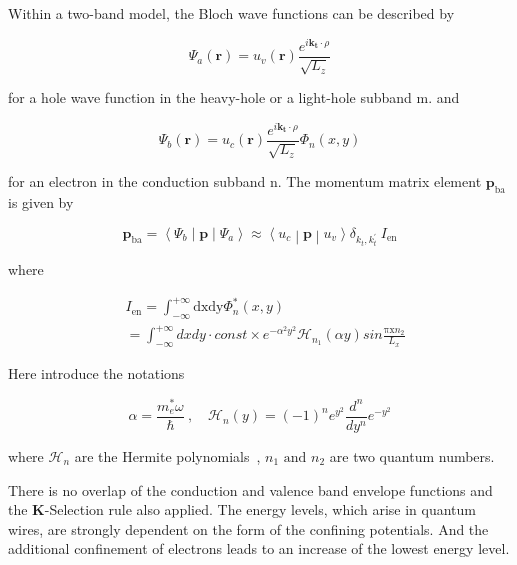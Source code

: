 Within a two-band model, the Bloch wave functions can be described by

\begin{equation}
\Psi_{a}\left( \bm{r} \right) = u_{v}(\bm{r})\frac{e^{i\bm{k}_{\bm{t}} \cdot \rho}}{\sqrt{L_{z}}}
\end{equation}

for a hole wave function in the heavy-hole or a light-hole subband m.
and

\begin{equation}
\Psi_{b}\left( \bm{r} \right) = u_{c}(\bm{r})\frac{e^{i\bm{k}_{\bm{t}} \cdot \rho}}{\sqrt{L_{z}}}\Phi_{n}(x,y)
\end{equation}

for an electron in the conduction subband n. The momentum matrix element
\(\bm{p}_{\text{ba}}\) is given by

\begin{equation}
\bm{p}_{\text{ba}}\bm{=}\left\langle \Psi_{b} \middle| \bm{p} \middle| \Psi_{a} \right\rangle \approx \left\langle u_{c} \middle| \bm{p} \middle| u_{v} \right\rangle\delta_{k_{t},k_{t}^{'}}\ I_{\text{en}}
\end{equation}

where

\begin{eqnarray}
  & I_{\text{en}} = \int_{- \infty}^{+ \infty}{\text{dxdy}\Phi_{n}^{*}\left( x,y \right)} \nonumber \\
  & = \int_{- \infty}^{+ \infty}{dxdy \cdot const \times e^{- \alpha^{2}y^{2}}\mathcal{H}_{n_{1}}(\alpha y)sin\frac{\text{πx}n_{2}}{L_{x}}}
\end{eqnarray}

Here introduce the notations

\begin{equation}
\alpha = \frac{m_{e}^{*}\omega}{\hbar}\ , \quad
\mathcal{H}_{n}\left( y \right) = {( - 1)}^{n}e^{y^{2}}\frac{d^{n}}{dy^{n}}e^{{- y}^{2}}
\end{equation}

where \(\mathcal{H}_{n}\) are the Hermite
polynomials~\cite{Mitin:1999vs},
\(n_{1}\text{\ and\ }n_{2}\) are two quantum numbers.

There is no overlap of the conduction and valence band envelope
functions and the \textbf{K}-Selection rule also applied. The energy
levels, which arise in quantum wires, are strongly dependent on the form
of the confining potentials. And the additional confinement of electrons
leads to an increase of the lowest energy level.

